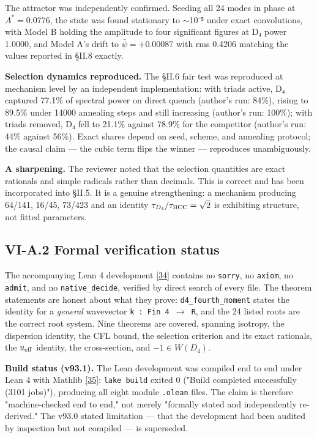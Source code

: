 \documentclass[a4paper,11pt]{article}
\begin{document}
The attractor was independently confirmed. Seeding all 24 modes in phase at $A^* = 0.0776$, the state was found stationary to $\sim$10⁻⁵ under exact convolutions, with Model B holding the amplitude to four significant figures at D₄ power 1.0000, and Model A's drift to $\bar\psi = +0.00087$ with rms 0.4206 matching the values reported in §II.8 exactly.

\textbf{Selection dynamics reproduced.} The §II.6 fair test was reproduced at mechanism level by an independent implementation: with triads active, D₄ captured 77.1\% of spectral power on direct quench (author's run: 84\%), rising to 89.5\% under 14000 annealing steps and still increasing (author's run: 100\%); with triads removed, D₄ fell to 21.1\% against 78.9\% for the competitor (author's run: 44\% against 56\%). Exact shares depend on seed, scheme, and annealing protocol; the causal claim — the cubic term flips the winner — reproduces unambiguously.

\textbf{A sharpening.} The reviewer noted that the selection quantities are exact rationals and simple radicals rather than decimals. This is correct and has been incorporated into §II.5. It is a genuine strengthening: a mechanism producing 64/141, 16/45, 73/423 and an identity $\tau_{D_4}/\tau_{\rm BCC} = \sqrt{2}$ is exhibiting structure, not fitted parameters.

\subsection*{VI-A.2 Formal verification status}

The accompanying Lean 4 development \hyperref[ref34]{[34]} contains no \texttt{sorry}, no \texttt{axiom}, no \texttt{admit}, and no \texttt{native\_decide}, verified by direct search of every file. The theorem statements are honest about what they prove: \texttt{d4\_fourth\_moment} states the identity for a \textit{general} wavevector \texttt{k : Fin 4 $\to$ R}, and the 24 listed roots are the correct root system. Nine theorems are covered, spanning isotropy, the dispersion identity, the CFL bound, the selection criterion and its exact rationals, the $u_{\rm eff}$ identity, the cross-section, and $-1\in W(D_4)$.

\textbf{Build status (v93.1).} The Lean development was compiled end to end under Lean 4 with Mathlib \hyperref[ref35]{[35]}: \texttt{lake build} exited 0 ("Build completed successfully (3101 jobs)"), producing all eight module \texttt{.olean} files. The claim is therefore "machine-checked end to end," not merely "formally stated and independently re-derived." The v93.0 stated limitation — that the development had been audited by inspection but not compiled — is superseded.
\end{document}

